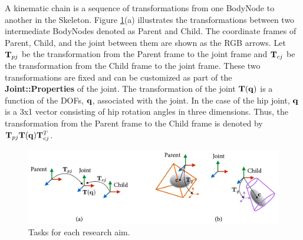 A kinematic chain is a sequence of transformations from one BodyNode to another in the Skeleton. Figure \ref{fig:parentChild}(a) illustrates the transformations between two intermediate BodyNodes denoted as Parent and Child. The coordinate frames of Parent, Child, and the joint between them are shown as the RGB arrows. Let $\mathbf{T}_{pj}$ be the transformation from the Parent frame to the joint frame and $\mathbf{T}_{cj}$ be the transformation from the Child frame to the joint frame. These two transformations are fixed and can be customized as part of the \textbf{Joint::Properties} of the joint. The transformation of the joint $\mathbf{T}(\mathbf{q})$ is a function of the DOFs, $\mathbf{q}$, associated with the joint. In the case of the hip joint, $\mathbf{q}$ is a 3x1 vector consisting of hip rotation angles in three dimensions. Thus, the transformation from the Parent frame to the Child frame is denoted by $\mathbf{T}_{pj}\mathbf{T}(\mathbf{q})\mathbf{T}_{cj}^T$.

\begin{figure}
\centering
\includegraphics[width=6.0in]{fig/parentChild.jpg}
\caption{Tasks for each research aim.}
\label{fig:parentChild}
\end{figure}


